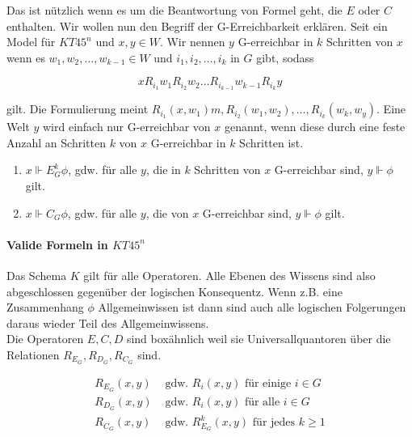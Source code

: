 Das  ist nützlich wenn es um die Beantwortung von Formel geht, die $E$ oder $C$ enthalten.
Wir wollen nun den Begriff der G-Erreichbarkeit erklären.
Seit \MMModelDef ein Model für $KT45^n$ und $x,y \in W$.
Wir nennen $y$ G-erreichbar in $k$ Schritten von $x$ wenn es $w_1, w_2, \dots, w_{k-1} \in W$ und $i_1, i_2, \dots, i_k$ in $G$ gibt, sodass 

\begin{equation*}
	x R_{i_1} w_1 R_{i_2} w_2 \dots R_{i_{k-1}} w_{k-1} R_{i_k} y
\end{equation*}

gilt.
Die Formulierung meint $R_{i_1}(x,w_1)m, R_{i_2}(w_1,w_2), \dots, R_{i_k}(w_k,w_y)$.
Eine Welt $y$ wird einfach nur G-erreichbar von $x$ genannt, wenn diese durch eine feste Anzahl an Schritten $k$ von $x$ G-erreichbar in $k$ Schritten ist.

\begin{theorem}
	\label{theo:gErreichbarkeit}
	\begin{enumerate}
		\item $x \Vdash E_{G}^{k} \phi$, gdw. für alle $y$, die in $k$ Schritten von $x$ G-erreichbar sind, $y \Vdash \phi$ gilt.
		\item $x \Vdash C_{G} \phi$, gdw. für alle $y$, die von $x$ G-erreichbar sind, $y \Vdash \phi$ gilt.
	\end{enumerate}
\end{theorem}



\paragraph{Valide Formeln in $KT45^n$}
\label{par:valid_formulas_in_kt45n}
Das Schema $K$ gilt für alle Operatoren.
Alle Ebenen des Wissens sind also abgeschlossen gegenüber der logischen Konsequentz.
Wenn z.B. eine Zusammenhang $\phi$ Allgemeinwissen ist dann sind auch alle logischen Folgerungen daraus wieder Teil des Allgemeinwissens.\\
Die Operatoren $E,C,D$ sind boxähnlich weil sie Universallquantoren über die Relationen $R_{E_G}, R_{D_G}, R_{C_G}$ sind.


\begin{align}
	R_{E_G}(x,y) &\text{ gdw. } R_i(x,y) \text{ für einige } i \in G\\
	R_{D_G}(x,y) &\text{ gdw. } R_i(x,y) \text{ für alle } i \in G\\
	R_{C_G}(x,y) &\text{ gdw. } R_{E_G}^k(x,y) \text{ für jedes } k \geq 1
\end{align}


